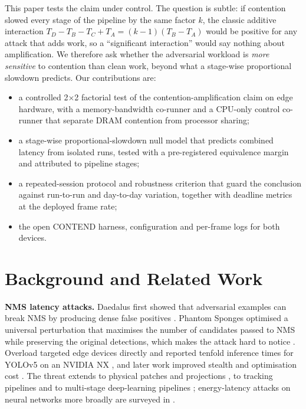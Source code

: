 \documentclass[conference]{IEEEtran}
\begin{document}
This paper tests the claim under control. The question is subtle: if contention slowed every
stage of the pipeline by the same factor $k$, the classic additive interaction
$T_D-T_B-T_C+T_A=(k-1)(T_B-T_A)$ would be positive for any attack that adds work, so a
``significant interaction'' would say nothing about amplification. We therefore ask whether the
adversarial workload is \emph{more sensitive} to contention than clean work, beyond what a
stage-wise proportional slowdown predicts. Our contributions are:
\begin{itemize}
\item a controlled 2$\times$2 factorial test of the contention-amplification claim on edge
hardware, with a memory-bandwidth co-runner and a CPU-only control co-runner that separate DRAM
contention from processor sharing;
\item a stage-wise proportional-slowdown null model that predicts combined latency from isolated
runs, tested with a pre-registered equivalence margin and attributed to pipeline stages;
\item a repeated-session protocol and robustness criterion that guard the conclusion against
run-to-run and day-to-day variation, together with deadline metrics at the deployed frame rate;
\item the open CONTEND harness, configuration and per-frame logs for both devices.
\end{itemize}

\section{Background and Related Work}
\textbf{NMS latency attacks.} Daedalus first showed that adversarial examples can break NMS by
producing dense false positives \cite{wang2021daedalus}. Phantom Sponges optimised a universal
perturbation that maximises the number of candidates passed to NMS while preserving the original
detections, which makes the attack hard to notice \cite{shapira2023phantom}. Overload targeted
edge devices directly and reported tenfold inference times for YOLOv5 on an NVIDIA NX
\cite{chen2024overload}, and later work improved stealth and optimisation cost
\cite{xia2026groundswell}. The threat extends to physical patches and projections
\cite{muller2025detstorm}, to tracking pipelines \cite{ma2024slowtrack,gu2026trackflood} and to
multi-stage deep-learning pipelines \cite{li2026aesop}; energy-latency attacks on neural networks
more broadly are surveyed in \cite{shumailov2021sponge,rathnasuriya2025sok}.
\end{document}
